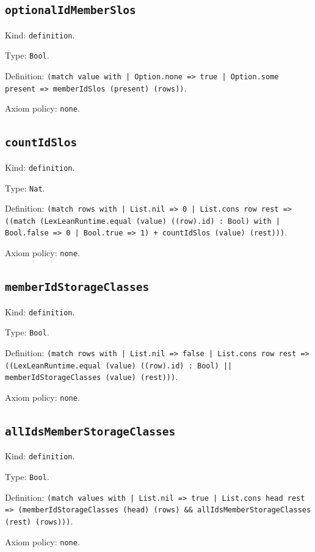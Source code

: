 \documentclass[11pt]{article}
\begin{document}
\subsection*{\texttt{optionalIdMemberSlos}}
\noindent Kind: \texttt{definition}.\par
\noindent Type: \texttt{Bool}.\par
\noindent Definition: \texttt{(match value with | Option.none => true | Option.some present => memberIdSlos (present) (rows))}.\par
\noindent Axiom policy: \texttt{none}.\par
\subsection*{\texttt{countIdSlos}}
\noindent Kind: \texttt{definition}.\par
\noindent Type: \texttt{Nat}.\par
\noindent Definition: \texttt{(match rows with | List.nil => 0 | List.cons row rest => ((match (LexLeanRuntime.equal (value) ((row).id) : Bool) with | Bool.false => 0 | Bool.true => 1) + countIdSlos (value) (rest)))}.\par
\noindent Axiom policy: \texttt{none}.\par
\subsection*{\texttt{memberIdStorageClasses}}
\noindent Kind: \texttt{definition}.\par
\noindent Type: \texttt{Bool}.\par
\noindent Definition: \texttt{(match rows with | List.nil => false | List.cons row rest => ((LexLeanRuntime.equal (value) ((row).id) : Bool) || memberIdStorageClasses (value) (rest)))}.\par
\noindent Axiom policy: \texttt{none}.\par
\subsection*{\texttt{allIdsMemberStorageClasses}}
\noindent Kind: \texttt{definition}.\par
\noindent Type: \texttt{Bool}.\par
\noindent Definition: \texttt{(match values with | List.nil => true | List.cons head rest => (memberIdStorageClasses (head) (rows) \&\& allIdsMemberStorageClasses (rest) (rows)))}.\par
\noindent Axiom policy: \texttt{none}.\par
\end{document}
